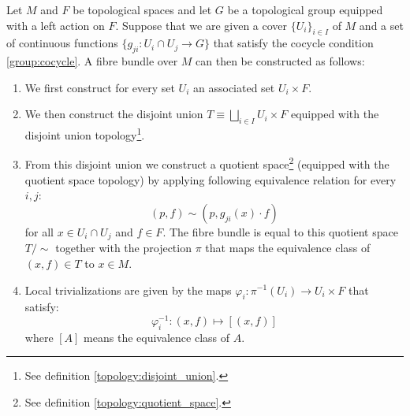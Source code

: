 	\begin{construct}\label{manifolds:theorem:fibre_bundle_construction_theorem}
		Let $M$ and $F$ be topological spaces and let $G$ be a topological group equipped with a left action on $F$. Suppose that we are given a cover $\{U_i\}_{i\in I}$ of $M$ and a set of continuous functions $\{g_{ji}:U_i\cap U_j\rightarrow G\}$ that satisfy the cocycle condition \ref{group:cocycle}. A fibre bundle over $M$ can then be constructed as follows:
		\begin{enumerate}
			\item We first construct for every set $U_i$ an associated set $U_i\times F$.
			\item We then construct the disjoint union $T\equiv\bigsqcup_{i\in I}U_i\times F$ equipped with the disjoint union topology\footnote{See definition \ref{topology:disjoint_union}.}.
			\item From this disjoint union we construct a quotient space\footnote{See definition \ref{topology:quotient_space}.} (equipped with the quotient space topology) by applying following equivalence relation for every $i, j$:
				\begin{equation}
					(p, f)\sim(p, g_{ji}(x)\cdot f)
				\end{equation}
				for all $x\in U_i\cap U_j$ and $f\in F$. The fibre bundle is equal to this quotient space $T/\sim$ together with the projection $\pi$ that maps the equivalence class of $(x, f)\in T$ to $x\in M$.
			\item Local trivializations are given by the maps $\varphi_i:\pi^{-1}(U_i)\rightarrow U_i\times F$ that satisfy:
				\begin{equation}
					\varphi_i^{-1}:(x, f)\mapsto [(x, f)]
				\end{equation}
				where $[A]$ means the equivalence class of $A$.
		\end{enumerate}
	\end{construct}
	
	
